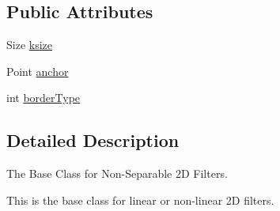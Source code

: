 \subsection*{Public Attributes}
\begin{DoxyCompactItemize}
\item 
Size \hyperlink{classcv_1_1ocl_1_1BaseFilter__GPU_a433c3b4149e762a56eea38f938b4a727}{ksize}
\item 
Point \hyperlink{classcv_1_1ocl_1_1BaseFilter__GPU_a0b79334caba140c25d6fc5c5f2a7fd6c}{anchor}
\item 
int \hyperlink{classcv_1_1ocl_1_1BaseFilter__GPU_a5d5aff7ac2df54c9df5a53f9a0ced130}{border\-Type}
\end{DoxyCompactItemize}


\subsection{Detailed Description}
The Base Class for Non-\/\-Separable 2\-D Filters.

This is the base class for linear or non-\/linear 2\-D filters. 

